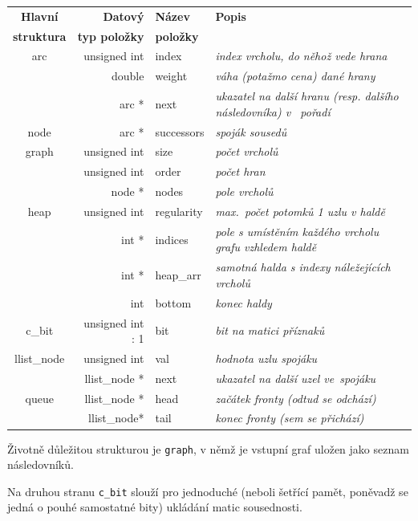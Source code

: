 \documentclass[11pt,a4paper]{article}
\begin{document}
\begin{tabular}{ | c || r | l | p{4cm} | }
  \hline
  \textbf{Hlavní} & \textbf{Datový} & \textbf{Název} & \textbf{Popis} \\
  \textbf{struktura} & \textbf{typ položky} & \textbf{položky} & \\
  \hline \hline
  arc & unsigned int & index & \textit{index vrcholu, do něhož vede hrana} \\
  & double & weight & \textit{váha (potažmo cena) dané hrany} \\ 
  & arc * & next & \textit{ukazatel na další hranu (resp. dalšího následovníka)
    v~ pořadí} \\
  \hline \hline
  node & arc * & successors & \textit{spoják sousedů} \\
  \hline \hline
  graph & unsigned int & size & \textit{počet vrcholů} \\
  & unsigned int & order & \textit{počet hran} \\
  & node * & nodes & \textit{pole vrcholů} \\ 
  \hline \hline
  heap & unsigned int & regularity & \textit{max.\ počet potomků 1 uzlu v haldě} \\
  & int * & indices & \textit{pole s umístěním každého vrcholu grafu vzhledem
    haldě} \\
  & int * & heap\_arr & \textit{samotná halda s indexy náležejících vrcholů} \\
  & int & bottom & \textit{konec haldy} \\ 
  \hline \hline
  c\_bit & unsigned int : 1 & bit & \textit{bit na matici příznaků} \\
  \hline \hline
  llist\_node & unsigned int & val & \textit{hodnota uzlu spojáku} \\
  & llist\_node * & next & \textit{ukazatel na další uzel ve~spojáku} \\
  \hline \hline
  queue & llist\_node * & head & \textit{začátek fronty (odtud se odchází)} \\
  & llist\_node* & tail & \textit{konec fronty (sem se přichází)} \\
  \hline
\end{tabular}

Životně důležitou strukturou je {\tt graph}, v němž je vstupní graf uložen jako
seznam následovníků.

Na druhou stranu {\tt c\_bit} slouží pro jednoduché (neboli šetřící pamět,
poněvadž se jedná o pouhé samostatné bity) ukládání matic sousednosti.
\end{document}
